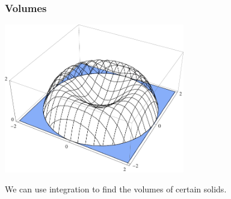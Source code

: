 \begin{frame}
\frametitle{Volumes}
\begin{center}
\includegraphics[height=6.5cm]{volumes/pictures/06-03-setup3d.pdf} %

We can use integration to find the volumes of certain solids.%
\end{center}
\end{frame}

